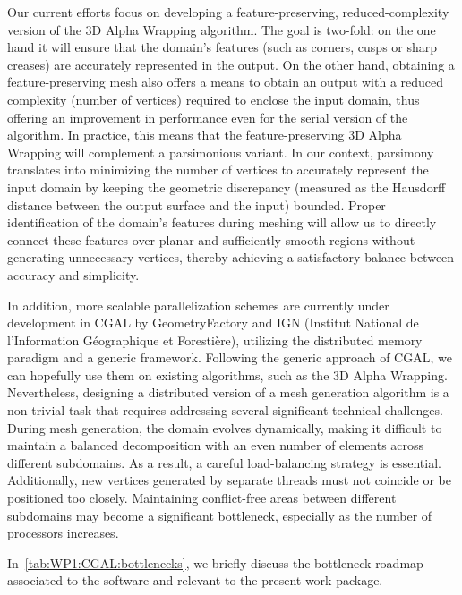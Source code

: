 Our current efforts focus on developing a feature-preserving, reduced-complexity version of the 3D Alpha Wrapping algorithm.
The goal is two-fold: on the one hand it will ensure that the domain's features (such as corners, cusps or sharp creases) are accurately represented in the output. On the other hand, obtaining a feature-preserving mesh also offers a means to obtain an output with a reduced complexity (number of vertices) required to enclose the input domain, thus offering an improvement in performance even for the serial version of the algorithm. 
In practice, this means that the feature-preserving 3D Alpha Wrapping will complement a parsimonious variant.
In our context, parsimony translates into minimizing the number of vertices to accurately represent the input domain by keeping the geometric discrepancy (measured as the Hausdorff distance between the output surface and the input) bounded.
Proper identification of the domain's features during meshing will allow us to directly connect these features over planar and sufficiently smooth regions without generating unnecessary vertices, thereby achieving a satisfactory balance between accuracy and simplicity.




In addition, more scalable parallelization schemes are currently under development in CGAL by GeometryFactory and IGN (Institut National de l'Information Géographique et Forestière), utilizing the distributed memory paradigm and a generic framework. Following the generic approach of CGAL, we can hopefully use them on existing algorithms, such as the 3D Alpha Wrapping.
Nevertheless, designing a distributed version of a mesh generation algorithm is a non-trivial task that requires addressing several significant technical challenges.
During mesh generation, the domain evolves dynamically, making it difficult to maintain a balanced decomposition with an even number of elements across different subdomains.
As a result, a careful load-balancing strategy is essential.
Additionally, new vertices generated by separate threads must not coincide or be positioned too closely. Maintaining conflict-free areas between different subdomains may become a significant bottleneck, especially as the number of processors increases.


In~\cref{tab:WP1:CGAL:bottlenecks}, we briefly discuss the bottleneck roadmap associated to the software and relevant to the present work package.


